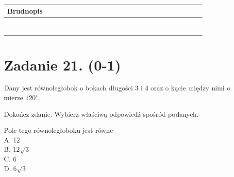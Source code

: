 \documentclass[10pt]{article}
\begin{document}
\begin{center}
\begin{tabular}{|c|c|c|c|c|c|c|c|c|c|c|c|c|c|c|c|c|c|c|c|c|c|c|c|c|c|c|c|}
\hline
\multicolumn{5}{|l|}{Brudnopis} &  &  &  &  &  &  &  &  &  &  &  &  &  &  &  &  &  &  &  &  &  &  &  \\
\hline
 &  &  &  &  &  &  &  &  &  &  &  &  &  &  &  &  &  &  &  &  &  &  &  &  &  &  &  \\
\hline
 &  &  &  &  &  &  &  &  &  &  &  &  &  &  &  &  &  &  &  &  &  &  &  &  &  &  &  \\
\hline
 &  &  &  &  &  &  &  &  &  &  &  &  &  &  &  &  &  &  &  &  &  &  &  &  &  &  &  \\
\hline
 &  &  &  &  &  &  &  &  &  &  &  &  &  &  &  &  &  &  &  &  &  &  &  &  &  &  &  \\
\hline
 &  &  &  &  &  &  &  &  &  &  &  &  &  &  &  &  &  &  &  &  &  &  &  &  &  &  &  \\
\hline
 &  &  &  &  &  &  &  &  &  &  &  &  &  &  &  &  &  &  &  &  &  &  &  &  &  &  &  \\
\hline
 &  &  &  &  &  &  &  &  &  &  &  &  &  &  &  &  &  &  &  &  &  &  &  &  &  &  &  \\
\hline
\end{tabular}
\end{center}

\section*{Zadanie 21. (0-1)}
Dany jest równoległobok o bokach długości 3 i 4 oraz o kącie między nimi o mierze \(120^{\circ}\).

Dokończ zdanie. Wybierz właściwą odpowiedź spośród podanych.

Pole tego równoległoboku jest równe\\
A. 12\\
B. \(12 \sqrt{3}\)\\
C. 6\\
D. \(6 \sqrt{3}\)
\end{document}
